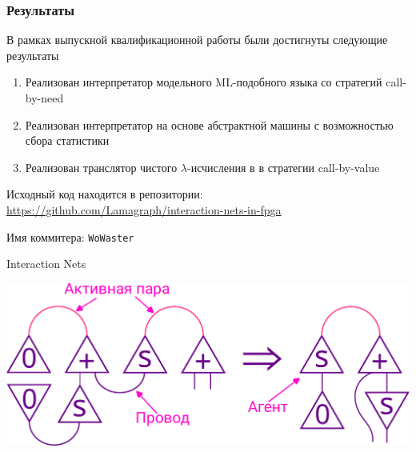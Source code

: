 \documentclass
  [ russian
  , aspectratio=169 %
  ] {beamer}
\begin{document}
\begin{frame}
    \frametitle{Результаты}
    В рамках выпускной квалификационной работы были достигнуты следующие результаты
    \begin{enumerate}
        \item Реализован интерпретатор модельного ML-подобного языка со стратегий call-by-need
        \item Реализован интерпретатор \INs{} на основе абстрактной машины с возможностью сбора статистики
        \item Реализован транслятор чистого $\lambda$-исчисления в \INs{} в стратегии call-by-value
    \end{enumerate}

    \vspace{1em}

    Исходный код находится в репозитории: \url{https://github.com/Lamagraph/interaction-nets-in-fpga}

    Имя коммитера: \texttt{WoWaster}
\end{frame}

\appendix
\begin{frame}{Interaction Nets}

    \begin{center}
        \includegraphics[width=\textwidth]{figures/in_talk.pdf}
    \end{center}

\end{frame}
\end{document}
